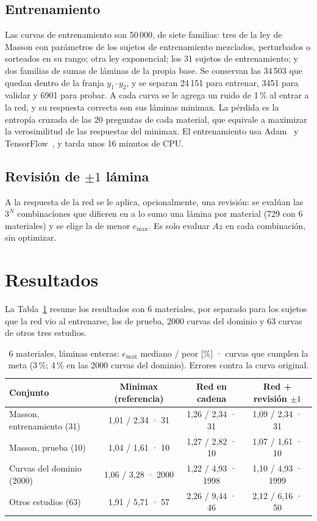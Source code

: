 \subsection{Entrenamiento}
Las curvas de entrenamiento son 50\,000, de siete familias: tres de la ley de Masson con parámetros de los sujetos de entrenamiento mezclados, perturbados o sorteados en su rango; otra ley exponencial; los 31 sujetos de entrenamiento; y dos familias de sumas de láminas de la propia base. Se conservan las 34\,503 que quedan dentro de la franja $y_1$--$y_2$, y se separan 24\,151 para entrenar, 3451 para validar y 6901 para probar. A cada curva se le agrega un ruido de 1\,\% al entrar a la red, y su respuesta correcta son sus láminas minimax. La pérdida es la entropía cruzada de las 20 preguntas de cada material, que equivale a maximizar la verosimilitud de las respuestas del minimax. El entrenamiento usa Adam~\cite{adam} y TensorFlow~\cite{tf}, y tarda unos 16 minutos de CPU.

\subsection{Revisión de $\pm1$ lámina}
A la respuesta de la red se le aplica, opcionalmente, una revisión: se evalúan las $3^N$ combinaciones que difieren en a lo sumo una lámina por material (729 con 6 materiales) y se elige la de menor $e_{\max}$. Es solo evaluar $Az$ en cada combinación, sin optimizar.

\section{Resultados}
La Tabla~\ref{tab:resumen} resume los resultados con 6 materiales, por separado para los sujetos que la red vio al entrenarse, los de prueba, 2000 curvas del dominio y 63 curvas de otros tres estudios.

\begin{table}[H]\centering\small
\caption{6 materiales, láminas enteras: $e_{\max}$ mediano / peor [\%] · curvas que cumplen la meta (3\,\%; 4\,\% en las 2000 curvas del dominio). Errores contra la curva original.}\label{tab:resumen}
\begin{tabular}{lccc}\toprule
Conjunto & Minimax (referencia) & Red en cadena & Red + revisión $\pm1$\\\midrule
Masson, entrenamiento (31) & 1,01 / 2,34 · 31 & 1,26 / 2,34 · 31 & 1,09 / 2,34 · 31\\
Masson, prueba (10) & 1,04 / 1,61 · 10 & 1,27 / 2,82 · 10 & 1,07 / 1,61 · 10\\
Curvas del dominio (2000) & 1,06 / 3,28 · 2000 & 1,22 / 4,93 · 1998 & 1,10 / 4,93 · 1999\\
Otros estudios (63) & 1,91 / 5,71 · 57 & 2,26 / 9,44 · 46 & 2,12 / 6,16 · 50\\\bottomrule
\end{tabular}
\end{table}

